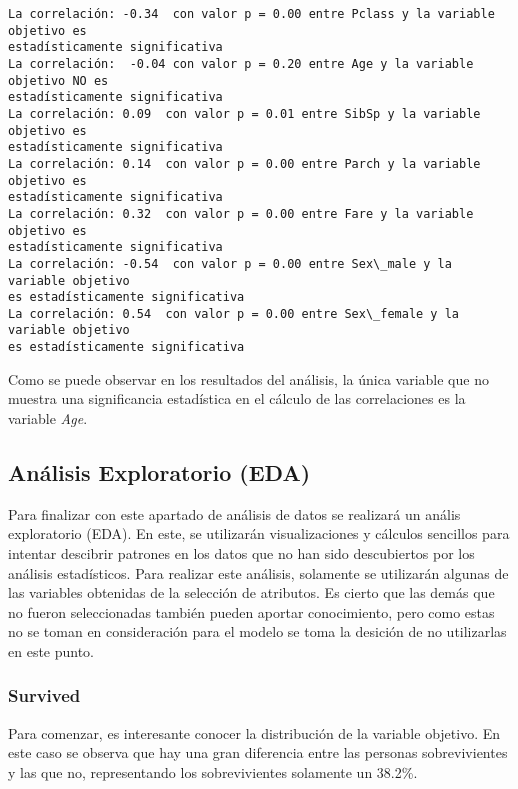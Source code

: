 \documentclass[11pt]{article}
\begin{document}
    \begin{Verbatim}[commandchars=\\\{\}]
La correlación: -0.34  con valor p = 0.00 entre Pclass y la variable objetivo es
estadísticamente significativa
La correlación:  -0.04 con valor p = 0.20 entre Age y la variable objetivo NO es
estadísticamente significativa
La correlación: 0.09  con valor p = 0.01 entre SibSp y la variable objetivo es
estadísticamente significativa
La correlación: 0.14  con valor p = 0.00 entre Parch y la variable objetivo es
estadísticamente significativa
La correlación: 0.32  con valor p = 0.00 entre Fare y la variable objetivo es
estadísticamente significativa
La correlación: -0.54  con valor p = 0.00 entre Sex\_male y la variable objetivo
es estadísticamente significativa
La correlación: 0.54  con valor p = 0.00 entre Sex\_female y la variable objetivo
es estadísticamente significativa
    \end{Verbatim}

    Como se puede observar en los resultados del análisis, la única variable
que no muestra una significancia estadística en el cálculo de las
correlaciones es la variable \emph{Age}.

    \hypertarget{anuxe1lisis-exploratorio-eda}{%
\subsection{Análisis Exploratorio
(EDA)}\label{anuxe1lisis-exploratorio-eda}}

    Para finalizar con este apartado de análisis de datos se realizará un
anális exploratorio (EDA). En este, se utilizarán visualizaciones y
cálculos sencillos para intentar descibrir patrones en los datos que no
han sido descubiertos por los análisis estadísticos. Para realizar este
análisis, solamente se utilizarán algunas de las variables obtenidas de
la selección de atributos. Es cierto que las demás que no fueron
seleccionadas también pueden aportar conocimiento, pero como estas no se
toman en consideración para el modelo se toma la desición de no
utilizarlas en este punto.

    \hypertarget{survived}{%
\subsubsection{Survived}\label{survived}}

Para comenzar, es interesante conocer la distribución de la variable
objetivo. En este caso se observa que hay una gran diferencia entre las
personas sobrevivientes y las que no, representando los sobrevivientes
solamente un 38.2\%.
\end{document}
